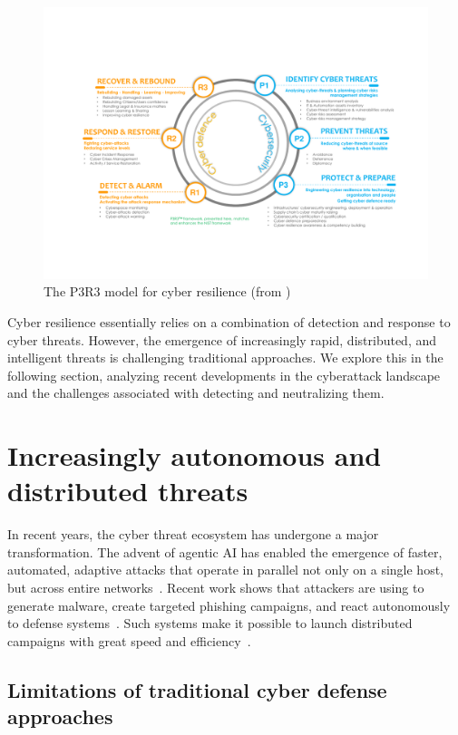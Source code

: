 \begin{figure}[h]
  \centering
  \includegraphics[width=\linewidth]{figures/P3R3.pdf}
  \caption{The P3R3 model for cyber resilience (from \autocite{Kott2023})}
  \label{fig:P3R3_model}
\end{figure}

\noindent
Cyber resilience essentially relies on a combination of detection and response to cyber threats. However, the emergence of increasingly rapid, distributed, and intelligent threats is challenging traditional approaches. We explore this in the following section, analyzing recent developments in the cyberattack landscape and the challenges associated with detecting and neutralizing them.


\section{Increasingly autonomous and distributed threats}\label{sec:evolution-threats}

In recent years, the cyber threat ecosystem has undergone a major transformation. The advent of agentic AI has enabled the emergence of faster, automated, adaptive attacks that operate in parallel not only on a single host, but across entire networks~\cite{Cohen2020}. Recent work shows that attackers are using  to generate malware, create targeted phishing campaigns, and react autonomously to defense systems~\cite{AutoAttacker2024}. Such systems make it possible to launch distributed campaigns with great speed and efficiency~\cite{AgenticAIThreats2025}.

\subsection*{Limitations of traditional cyber defense approaches}

